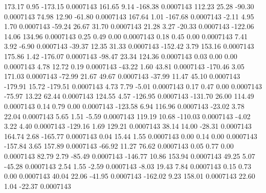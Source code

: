       173.17        0.95     -173.15     0.0007143
      161.65        9.14     -168.38     0.0007143
      112.23       25.28      -90.30     0.0007143
       74.98       12.90      -61.80     0.0007143
      167.64        1.01     -167.68     0.0007143
       -2.11        4.95        1.70     0.0007143
      -59.24       26.67       31.70     0.0007143
       21.28        3.27      -20.33     0.0007143
     -122.06       14.06      134.96     0.0007143
        0.25        0.49        0.00     0.0007143
        0.18        0.45        0.00     0.0007143
        7.41        3.92       -6.90     0.0007143
      -39.37       12.35       31.33     0.0007143
     -152.42        3.79      153.16     0.0007143
      175.86        1.42     -176.07     0.0007143
      -98.47       23.34      124.36     0.0007143
        0.03        0.00        0.00     0.0007143
        4.78       12.72        0.19     0.0007143
      -43.22        1.60       43.81     0.0007143
     -170.46        3.05      171.03     0.0007143
      -72.99       21.67       49.67     0.0007143
      -37.99       11.47       45.10     0.0007143
     -179.91       15.72     -179.51     0.0007143
        4.73        7.79       -5.01     0.0007143
        0.17        0.47        0.00     0.0007143
      -75.97       13.22       62.44     0.0007143
      124.55        4.57     -126.95     0.0007143
     -131.70       26.00      114.49     0.0007143
        0.14        0.79        0.00     0.0007143
     -123.58        6.94      116.96     0.0007143
      -23.02        3.78       22.04     0.0007143
        5.65        1.51       -5.59     0.0007143
      119.19       10.68     -110.03     0.0007143
       -4.02        3.22        4.40     0.0007143
     -129.16        1.69      129.21     0.0007143
       38.14       14.00      -28.31     0.0007143
      164.74        2.68     -165.77     0.0007143
        0.04       15.44        1.55     0.0007143
        0.00        0.14        0.00     0.0007143
     -157.84        3.65      157.89     0.0007143
      -66.92       11.27       76.62     0.0007143
        0.05        0.77        0.00     0.0007143
       82.79        2.79      -85.49     0.0007143
     -146.77       10.86      153.94     0.0007143
       49.25        5.07      -45.28     0.0007143
        2.54        1.55       -2.59     0.0007143
       -8.03       19.43        7.84     0.0007143
        0.15        0.73        0.00     0.0007143
       40.04       22.06      -41.95     0.0007143
     -162.02        9.23      158.01     0.0007143
       22.60        1.04      -22.37     0.0007143

